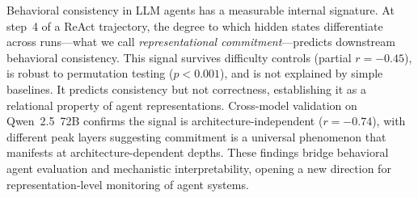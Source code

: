 \documentclass{article}
\begin{document}
Behavioral consistency in LLM agents has a measurable internal signature. At step~4 of a ReAct trajectory, the degree to which hidden states differentiate across runs---what we call \emph{representational commitment}---predicts downstream behavioral consistency. This signal survives difficulty controls (partial $r = -0.45$), is robust to permutation testing ($p < 0.001$), and is not explained by simple baselines. It predicts consistency but not correctness, establishing it as a relational property of agent representations. Cross-model validation on Qwen~2.5~72B confirms the signal is architecture-independent ($r = -0.74$), with different peak layers suggesting commitment is a universal phenomenon that manifests at architecture-dependent depths. These findings bridge behavioral agent evaluation and mechanistic interpretability, opening a new direction for representation-level monitoring of agent systems.



\end{document}
